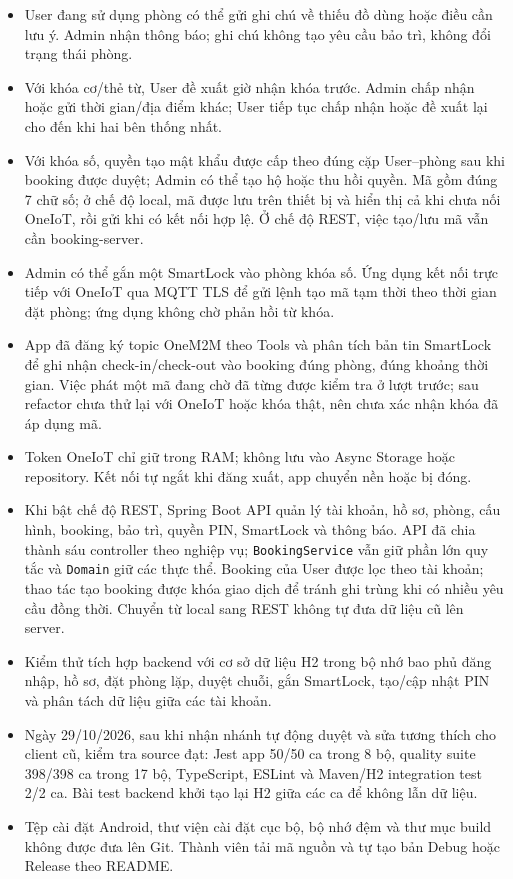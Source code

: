 \documentclass[12pt,a4paper]{article}
\begin{document}
\begin{itemize}[leftmargin=1.6em,itemsep=2pt,topsep=2pt]
  \item User đang sử dụng phòng có thể gửi ghi chú về thiếu đồ dùng hoặc điều cần lưu ý. Admin nhận thông báo; ghi chú không tạo yêu cầu bảo trì, không đổi trạng thái phòng.
  \item Với khóa cơ/thẻ từ, User đề xuất giờ nhận khóa trước. Admin chấp nhận hoặc gửi thời gian/địa điểm khác; User tiếp tục chấp nhận hoặc đề xuất lại cho đến khi hai bên thống nhất.
  \item Với khóa số, quyền tạo mật khẩu được cấp theo đúng cặp User--phòng sau khi booking được duyệt; Admin có thể tạo hộ hoặc thu hồi quyền. Mã gồm đúng 7 chữ số; ở chế độ local, mã được lưu trên thiết bị và hiển thị cả khi chưa nối OneIoT, rồi gửi khi có kết nối hợp lệ. Ở chế độ REST, việc tạo/lưu mã vẫn cần booking-server.
  \item Admin có thể gắn một SmartLock vào phòng khóa số. Ứng dụng kết nối trực tiếp với OneIoT qua MQTT TLS để gửi lệnh tạo mã tạm thời theo thời gian đặt phòng; ứng dụng không chờ phản hồi từ khóa.
  \item App đã đăng ký topic OneM2M theo Tools và phân tích bản tin SmartLock để ghi nhận check-in/check-out vào booking đúng phòng, đúng khoảng thời gian. Việc phát một mã đang chờ đã từng được kiểm tra ở lượt trước; sau refactor chưa thử lại với OneIoT hoặc khóa thật, nên chưa xác nhận khóa đã áp dụng mã.
  \item Token OneIoT chỉ giữ trong RAM; không lưu vào Async Storage hoặc repository. Kết nối tự ngắt khi đăng xuất, app chuyển nền hoặc bị đóng.
  \item Khi bật chế độ REST, Spring Boot API quản lý tài khoản, hồ sơ, phòng, cấu hình, booking, bảo trì, quyền PIN, SmartLock và thông báo. API đã chia thành sáu controller theo nghiệp vụ; \texttt{BookingService} vẫn giữ phần lớn quy tắc và \texttt{Domain} giữ các thực thể. Booking của User được lọc theo tài khoản; thao tác tạo booking được khóa giao dịch để tránh ghi trùng khi có nhiều yêu cầu đồng thời. Chuyển từ local sang REST không tự đưa dữ liệu cũ lên server.
  \item Kiểm thử tích hợp backend với cơ sở dữ liệu H2 trong bộ nhớ bao phủ đăng nhập, hồ sơ, đặt phòng lặp, duyệt chuỗi, gắn SmartLock, tạo/cập nhật PIN và phân tách dữ liệu giữa các tài khoản.
  \item Ngày 29/10/2026, sau khi nhận nhánh tự động duyệt và sửa tương thích cho client cũ, kiểm tra source đạt: Jest app 50/50 ca trong 8 bộ, quality suite 398/398 ca trong 17 bộ, TypeScript, ESLint và Maven/H2 integration test 2/2 ca. Bài test backend khởi tạo lại H2 giữa các ca để không lẫn dữ liệu.
  \item Tệp cài đặt Android, thư viện cài đặt cục bộ, bộ nhớ đệm và thư mục build không được đưa lên Git. Thành viên tải mã nguồn và tự tạo bản Debug hoặc Release theo README.
\end{itemize}
\end{document}
